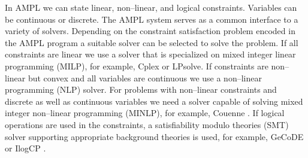 \documentclass[runningheads,a4paper]{llncs}%
\begin{document}
In AMPL we can state linear, non--linear, and logical constraints. Variables can be continuous or discrete. The AMPL system serves as a common interface to a variety of solvers. Depending on the constraint satisfaction problem encoded in the AMPL program a suitable solver can be selected to solve the problem. If all constraints are linear we use a solver that is specialized on mixed integer linear programming (MILP), for example, Cplex or LPsolve\cite{lpsolve}. If constraints are non--linear but convex and all variables are continuous we use a non--linear programming (NLP) solver. For problems with non--linear constraints and discrete as well as continuous variables we need a solver capable of solving mixed integer non--linear programming (MINLP), for example, Couenne \cite{Belotti09couenne}. If logical operations are used in the constraints, a satisfiability modulo theories (SMT) solver supporting appropriate background theories is used, for example, GeCoDE \cite{gecode} or IlogCP \cite{ilogcp}.%
\end{document}
